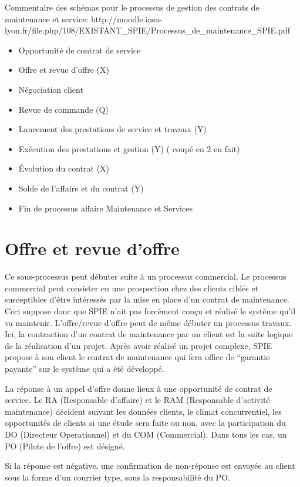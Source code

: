 Commentaire des schémas pour le processus de gestion des contrats de maintenance et service: http://moodle.insa-lyon.fr/file.php/108/EXISTANT_SPIE/Processus_de_maintenance_SPIE.pdf

\begin{itemize}
\item Opportunité de contrat de service
\item Offre et revue d’offre (X)
\item Négociation client 
\item Revue de commande (Q)
\item Lancement des prestations de service et travaux (Y)
\item Exécution des prestations et gestion (Y) ( coupé en 2 en fait)
\item Évolution du contrat (X)
\item Solde de l’affaire et du contrat (Y)
\item Fin de processus affaire Maintenance et Services
\end{itemize}

\section{Offre et revue d’offre}

Ce sous-processus peut débuter suite à un processus commercial. Le processus commercial peut consister en une prospection chez des clients ciblés et susceptibles d’être intéressés par la mise en place d’un contrat de maintenance. Ceci suppose donc que SPIE n’ait pas forcément conçu et réalisé le système qu’il va maintenir. L’offre/revue d’offre peut de même débuter  un processus travaux. Ici, la contraction d’un contrat de maintenance par un client est la suite logique de la réalisation d’un projet. Après avoir réalisé un projet complexe, SPIE propose à son client le contrat de maintenance qui fera office de “garantie payante” sur le système qui a été développé.

La réponse à un appel d’offre donne lieux à une opportunité de contrat de service. Le RA (Responsable d’affaire) et le RAM (Responsable d’activité maintenance) décident suivant les données clients, le climat concurrentiel, les opportunités de clients si une étude sera faite ou non, avec la participation du DO (Directeur Operationnel) et du COM (Commercial). Dans tous les cas, un PO (Pilote de l’offre) est désigné.

Si la réponse est négative, une confirmation de non-réponse est envoyée au client sous la forme d’un courrier type, sous la responsabilité du PO.

